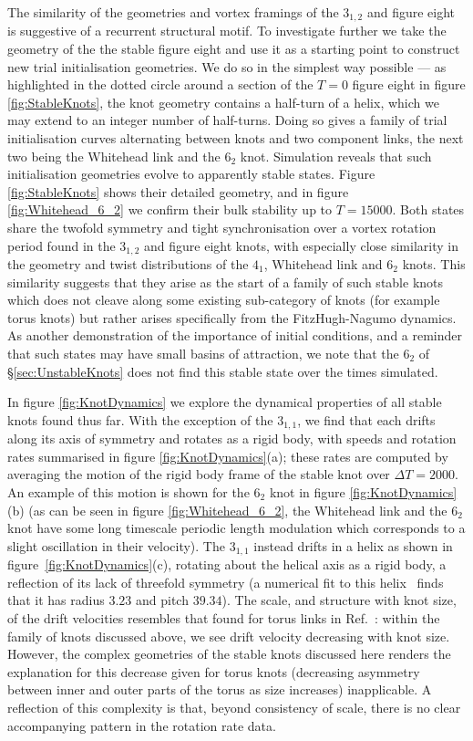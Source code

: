 The similarity of the geometries and vortex framings of the $3_{1,2}$ and figure eight is suggestive of a recurrent structural motif. To investigate further we take the geometry of the the stable figure eight and use it as a starting point to construct new trial initialisation geometries. We do so in the simplest way possible --- as highlighted in the dotted circle around a section of the $T=0$ figure eight in figure \ref{fig:StableKnots}, the knot geometry contains a half-turn of a helix, which we may extend to an integer number of half-turns. Doing so gives a family of trial initialisation curves alternating between knots and two component links, the next two being the Whitehead link and the $6_2$ knot. Simulation reveals that such initialisation geometries evolve to apparently stable states. Figure \ref{fig:StableKnots} shows their detailed geometry, and in figure \ref{fig:Whitehead_6_2} we confirm their bulk stability up to $T=15000$. Both states share the twofold symmetry and tight synchronisation over a vortex rotation period found in the $3_{1,2}$ and figure eight knots, with especially close similarity in the geometry and twist distributions of the $4_1$, Whitehead link and $6_2$ knots. This similarity suggests that they arise as the start of a family of such stable knots which does not cleave along some existing sub-category of knots (for example torus knots) but rather arises specifically from the FitzHugh-Nagumo dynamics. As another demonstration of the importance of initial conditions, and a reminder that such states may have small basins of attraction, we note that the $6_2$ of \S \ref{sec:UnstableKnots} does not find this stable state over the times simulated.

In figure \ref{fig:KnotDynamics} we explore the dynamical properties of all stable knots found thus far. With the exception of the $3_{1,1}$, we find that each drifts along its axis of symmetry and rotates as a rigid body, with speeds and rotation rates summarised in figure \ref{fig:KnotDynamics}(a); these rates are computed by averaging the motion of the rigid body frame of the stable knot over $\Delta T = 2000$. An example of this motion is shown for the $6_2$ knot in figure \ref{fig:KnotDynamics}(b) (as can be seen in figure \ref{fig:Whitehead_6_2}, the Whitehead link and the $6_2$ knot have some long timescale periodic length modulation which corresponds to a slight oscillation in their velocity). The $3_{1,1}$ instead drifts in a helix as shown in figure~\ref{fig:KnotDynamics}(c), rotating about the helical axis as a rigid body, a reflection of its lack of threefold symmetry (a numerical fit to this helix~\citep{Enkhbayar2008} finds that it has radius $3.23$ and pitch $39.34$). The scale, and structure with knot size, of the drift velocities resembles that found for torus links in Ref.~\citep{Maucher2019}: within the family of knots discussed above, we see drift velocity decreasing with knot size. However, the complex geometries of the stable knots discussed here renders the explanation for this decrease given for torus knots (decreasing asymmetry between inner and outer parts of the torus as size increases) inapplicable. A reflection of this complexity is that, beyond consistency of scale, there is no clear accompanying pattern in the rotation rate data.

